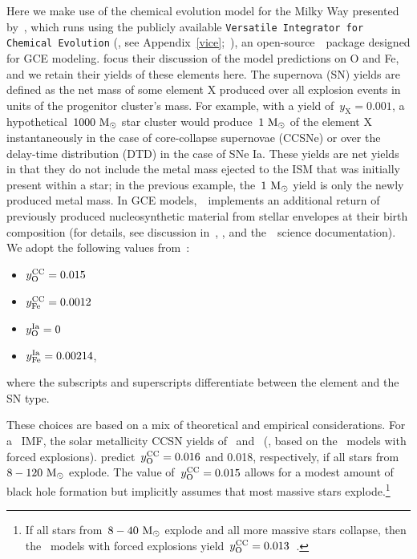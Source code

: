 Here we make use of the chemical evolution model for the Milky Way
presented by~\citet{Johnson2021}, which runs using the publicly available
\texttt{Versatile Integrator for Chemical Evolution}
(\vice, see Appendix~\ref{vice};~\citealp{Johnson2020, Griffith2021b,
Johnson2021}), an open-source~\python~package designed for GCE modeling.
\citet{Johnson2021} focus their discussion of the model predictions on O and
Fe, and we retain their yields of these elements here.
The supernova (SN) yields are defined as the net mass of some element X
produced over all explosion events in units of the progenitor cluster's mass.
For example, with a yield of~$y_\text{X} = 0.001$, a hypothetical~$1000~\text{M}_\odot$
star cluster would produce~$1~\text{M}_\odot$ of the element X instantaneously in the
case of core-collapse supernovae (CCSNe) or over the delay-time distribution
(DTD) in the case of SNe Ia.
These yields are net yields in that they do not include the metal mass
ejected to the ISM that was initially present within a star; in the previous
example, the~$1~\text{M}_\odot$ yield is only the newly produced metal mass.
In GCE models,~\vice~implements an additional return of
previously produced nucleosynthetic material from stellar envelopes at their
birth composition (for details, see discussion in~\citealt{Johnson2020},
\citealt{Johnson2021}, and the~\vice~science documentation).
We adopt the following values from~\citet{Johnson2021}:
\begin{itemize}
	\item $y_\text{O}^\text{CC} = 0.015$

	\item $y_\text{Fe}^\text{CC} = 0.0012$

	\item $y_\text{O}^\text{Ia} = 0$

	\item $y_\text{Fe}^\text{Ia} = 0.00214$,
\end{itemize}
where the subscripts and superscripts differentiate between the element and the
SN type.
\par
These choices are based on a mix of theoretical and empirical considerations.
For a~\citet{Kroupa2001} IMF,
the solar metallicity CCSN yields of~\citet{Chieffi2013}
and~\citeauthor{Griffith2021b} (\citeyear{Griffith2021b}, based on
the~\citealt{Sukhbold2016} models with forced explosions).
predict~$y_\text{O}^\text{CC} = 0.016$ and 0.018, respectively, if all stars
from~$8 - 120~\text{M}_\odot$ explode.
The value of~$y_\text{O}^\text{CC} = 0.015$ allows for a modest amount of black hole
formation but implicitly assumes that most massive stars explode.\footnote{
	If all stars from~$8 - 40~\text{M}_\odot$ explode and all more massive stars
	collapse, then the~\citet{Sukhbold2016} models with forced explosions
	yield~$y_\text{O}^\text{CC} = 0.013$~\citep{Griffith2021b}.
}
